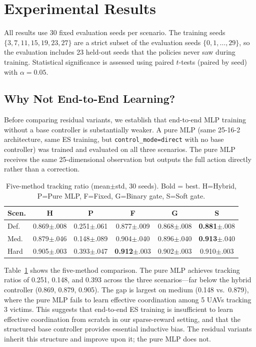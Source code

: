 \documentclass[journal]{IEEEtran}
\begin{document}
\section{Experimental Results}
\label{sec:results}

All results use 30 fixed evaluation seeds per scenario. The training seeds
$\{3, 7, 11, 15, 19, 23, 27\}$ are a strict subset of the evaluation seeds
$\{0, 1, \ldots, 29\}$, so the evaluation includes 23 held-out seeds that the
policies never saw during training. Statistical significance is assessed using
paired $t$-tests (paired by seed) with $\alpha = 0.05$.

\subsection{Why Not End-to-End Learning?}
\label{sec:e2e}

Before comparing residual variants, we establish that end-to-end MLP training without
a base controller is substantially weaker. A pure MLP (same 25-16-2 architecture,
same ES training, but \texttt{control\_mode=direct} with no base controller) was
trained and evaluated on all three scenarios. The pure MLP receives the same 25-dimensional
observation but outputs the full action directly rather than a correction.

\begin{table}[t]
\centering
\caption{Five-method tracking ratio (mean$\pm$std, 30 seeds). Bold = best.
H=Hybrid, P=Pure MLP, F=Fixed, G=Binary gate, S=Soft gate.}
\label{tab:five_method}
\scriptsize
\setlength{\tabcolsep}{3pt}
\begin{tabular}{@{}lccccc@{}}
\toprule
Scen. & H & P & F & G & S \\
\midrule
Def. & 0.869\tiny{$\pm$.008} & 0.251\tiny{$\pm$.061} & 0.877\tiny{$\pm$.009} & 0.868\tiny{$\pm$.008} & \textbf{0.881}\tiny{$\pm$.008} \\
Med. & 0.879\tiny{$\pm$.046} & 0.148\tiny{$\pm$.089} & 0.904\tiny{$\pm$.040} & 0.896\tiny{$\pm$.040} & \textbf{0.913}\tiny{$\pm$.040} \\
Hard & 0.905\tiny{$\pm$.003} & 0.393\tiny{$\pm$.047} & \textbf{0.912}\tiny{$\pm$.003} & 0.902\tiny{$\pm$.003} & 0.910\tiny{$\pm$.003} \\
\bottomrule
\end{tabular}
\end{table}

Table~\ref{tab:five_method} shows the five-method comparison. The pure MLP achieves
tracking ratios of 0.251, 0.148, and 0.393 across the three scenarios---far below
the hybrid controller (0.869, 0.879, 0.905). The gap is largest on medium (0.148 vs.\
0.879), where the pure MLP fails to learn effective coordination among 5 UAVs tracking
3 victims. This suggests that end-to-end ES training is insufficient to learn effective
coordination from scratch in our sparse-reward setting, and that the structured base
controller provides essential inductive bias. The residual variants inherit this structure and improve upon it; the
pure MLP does not.
\end{document}
